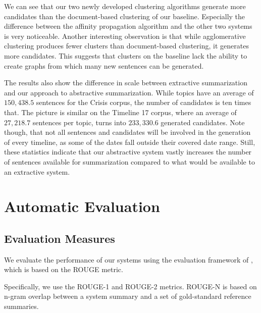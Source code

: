 \documentclass[a4paper,BCOR=10mm]{report}
\numberwithin{lemma}{chapter}
\numberwithin{definition}{chapter}
\begin{document}
We can see that our two newly developed clustering algorithms generate more candidates than the document-based clustering of our baseline. Especially the difference between the affinity propagation algorithm and the other two systems is very noticeable.
Another interesting observation is that while agglomerative clustering produces fewer clusters than document-based clustering, it generates more candidates. This suggests that clusters on the baseline lack the ability to create graphs from which many new sentences can be generated.

The results also show the difference in scale between extractive summarization and our approach to abstractive summarization.
While topics have an average of $150,438.5$ sentences for the Crisis corpus, the number of candidates is ten times that.
The picture is similar on the Timeline 17 corpus, where an average of $27,218.7$ sentences per topic, turns into $233,330.6$ generated candidates. Note though, that not all sentences and candidates will be involved in the generation of every timeline, as some of the dates fall outside their covered date range.
Still, these statistics indicate that our abstractive system vastly increases the number of sentences available for summarization compared to what would be available to an extractive system.


%
%

\chapter{Automatic Evaluation} \label{sec:results-auto}

\section{Evaluation Measures} \label{sec:evaluation-auto-setup}

We evaluate the performance of our systems using the evaluation framework of \citet{tilse}, which is based on the ROUGE \citep{rouge} metric.

Specifically, we use the ROUGE-1 and ROUGE-2 metrics.
ROUGE-N is based on n-gram overlap between a system summary and a set of gold-standard reference summaries.
\end{document}
